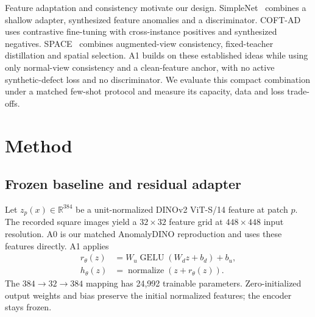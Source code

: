 Feature adaptation and consistency motivate our design. SimpleNet~\cite{liu2023simplenet} combines a shallow adapter, synthesized feature anomalies and a discriminator. COFT-AD~\cite{liao2024coftad} uses contrastive fine-tuning with cross-instance positives and synthesized negatives. SPACE~\cite{kim2025space} combines augmented-view consistency, fixed-teacher distillation and spatial selection. A1 builds on these established ideas while using only normal-view consistency and a clean-feature anchor, with no active synthetic-defect loss and no discriminator. We evaluate this compact combination under a matched few-shot protocol and measure its capacity, data and loss trade-offs.

\section{Method}
\label{sec:method}
\subsection{Frozen baseline and residual adapter}
Let $z_p(x)\in\mathbb{R}^{384}$ be a unit-normalized DINOv2 ViT-S/14 feature at patch $p$. The recorded square images yield a $32\times32$ feature grid at $448\times448$ input resolution. A0 is our matched AnomalyDINO reproduction and uses these features directly. A1 applies
\begin{equation}
\begin{aligned}
r_\theta(z)&=W_u\operatorname{GELU}(W_dz+b_d)+b_u,\\
h_\theta(z)&=\operatorname{normalize}(z+r_\theta(z)).
\end{aligned}
\label{eq:adapter}
\end{equation}
The $384\rightarrow32\rightarrow384$ mapping has 24,992 trainable parameters. Zero-initialized output weights and bias preserve the initial normalized features; the encoder stays frozen.

